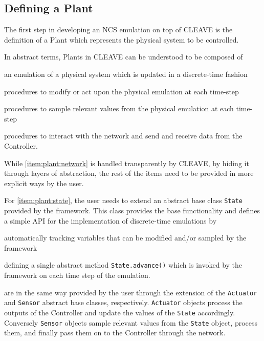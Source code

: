 \subsection{Defining a Plant}

The first step in developing an \ac{NCS} emulation on top of \ac{CLEAVE} is the definition of a Plant which represents the physical system to be controlled.

In abstract terms, Plants in \ac{CLEAVE} can be understood to be composed of
\begin{enumerate*}[itemjoin={{; }}, itemjoin*={{; and }}]
    \item\label{item:plant:state} an emulation of a physical system which is updated in a discrete-time fashion
    \item\label{item:plant:actuators} procedures to modify or act upon the physical emulation at each time-step
    \item\label{item:plant:sensors} procedures to sample relevant values from the physical emulation at each time-step
    \item\label{item:plant:network} procedures to interact with the network and send and receive data from the Controller.
\end{enumerate*}

While \cref{item:plant:network} is handled transparently by CLEAVE, by hiding it through layers of abstraction, the rest of the items need to be provided in more explicit ways by the user.

For \cref{item:plant:state}, the user needs to extend an abstract base class \texttt{State} provided by the framework.
This class provides the base functionality and defines a simple API for the implementation of discrete-time emulations by
\begin{enumerate*}[itemjoin={{; }}, itemjoin*={{; and }}]
    \item automatically tracking variables that can be modified and/or sampled by the framework
    \item defining a single abstract method \texttt{State.advance()} which is invoked by the framework on each time step of the emulation.
\end{enumerate*}

 are in the same way provided by the user through the extension of the \texttt{Actuator} and \texttt{Sensor} abstract base classes, respectively.
\texttt{Actuator} objects process the outputs of the Controller and update the values of the \texttt{State} accordingly.
Conversely \texttt{Sensor} objects sample relevant values from the \texttt{State} object, process them, and finally pass them on to the Controller through the network.

